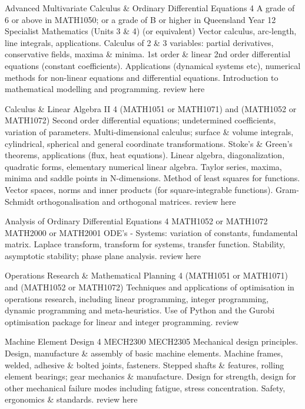 	{Advanced Multivariate Calculus \& Ordinary Differential Equations}
	{4}
	{A grade of 6 or above in MATH1050; or a grade of B or higher in Queensland Year 12 Specialist Mathematics (Units 3 \& 4) (or equivalent)}
	{}
	{}
	{Vector calculus, arc-length, line integrals, applications. Calculus of 2 \& 3 variables: partial derivatives, conservative fields, maxima \& minima. 1st order \& linear 2nd order differential equations (constant coefficients). Applications (dynamical systems etc), numerical methods for non-linear equations and differential equations. Introduction to mathematical modelling and programming.}
	{review here}

	{Calculus \& Linear Algebra II}
	{4}
	{(MATH1051 or MATH1071) and (MATH1052 or MATH1072)}
	{}
	{}
	{Second order differential equations; undetermined coefficients, variation of parameters. Multi-dimensional calculus; surface \& volume integrals, cylindrical, spherical and general coordinate transformations. Stoke's \& Green's theorems, applications (flux, heat equations). Linear algebra, diagonalization, quadratic forms, elementary numerical linear algebra. Taylor series, maxima, minima and saddle points in N-dimensions. Method of least squares for functions. Vector spaces, norms and inner products (for square-integrable functions). Gram-Schmidt orthogonalisation and orthogonal matrices.}
	{review here}

	{Analysis of Ordinary Differential Equations}
	{4}
	{MATH1052 or MATH1072}
	{}
	{MATH2000 or MATH2001}
	{ODE's - Systems: variation of constants, fundamental matrix. Laplace transform, transform for systems, transfer function. Stability, asymptotic stability; phase plane analysis.}
	{review here}

	{Operations Research \& Mathematical Planning}
	{4}
	{(MATH1051 or MATH1071) and (MATH1052 or MATH1072)}
	{}
	{}
	{Techniques and applications of optimisation in operations research, including linear programming, integer programming, dynamic programming and meta-heuristics. Use of Python and the Gurobi optimisation package for linear and integer programming.}
	{review}

	{Machine Element Design}
	{4}
	{MECH2300}
	{MECH2305}
	{}
	{Mechanical design principles. Design, manufacture \& assembly of basic machine elements. Machine frames, welded, adhesive \& bolted joints, fasteners. Stepped shafts \& features, rolling element bearings; gear mechanics \& manufacture. Design for strength, design for other mechanical failure modes including fatigue, stress concentration. Safety, ergonomics \& standards.}
	{review here}

